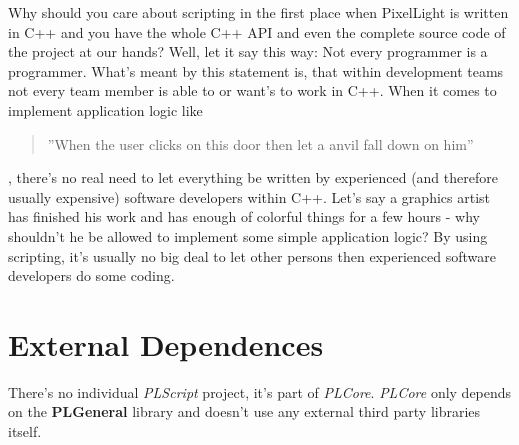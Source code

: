 Why should you care about scripting in the first place when PixelLight is written in C++ and you have the whole C++ API and even the complete source code of the project at our hands? Well, let it say this way: Not every programmer is a programmer. What's meant by this statement is, that within development teams not every team member is able to or want's to work in C++. When it comes to implement application logic like \begin{quote}''When the user clicks on this door then let a anvil fall down on him''\end{quote}, there's no real need to let everything be written by experienced (and therefore usually expensive) software developers within C++. Let's say a graphics artist has finished his work and has enough of colorful things for a few hours - why shouldn't he be allowed to implement some simple application logic? By using scripting, it's usually no big deal to let other persons then experienced software developers do some coding.




\section{External Dependences}
There's no individual \emph{PLScript} project, it's part of \emph{PLCore}. \emph{PLCore} only depends on the \textbf{PLGeneral} library and doesn't use any external third party libraries itself.
